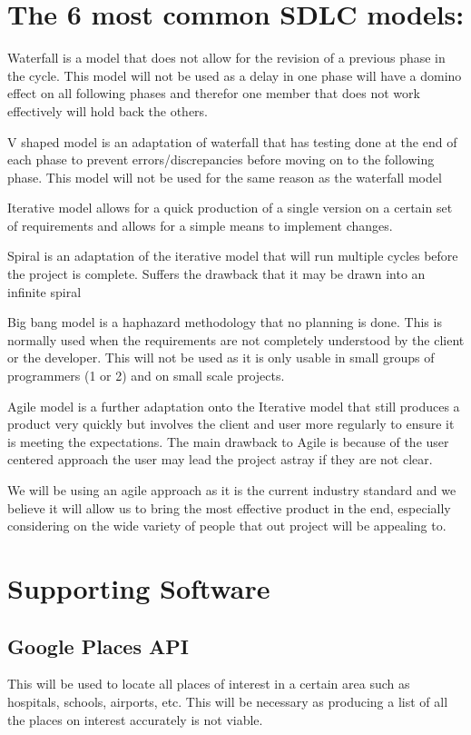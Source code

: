 \documentclass[11pt]{article}
\begin{document}
\section{The 6 most common SDLC models:}

Waterfall is a model that does not allow for the revision of a previous phase in the cycle. This model will not be used as a delay in one phase will have a domino effect on all following phases and therefor one member that does not work effectively will hold back the others.

V shaped model is an adaptation of waterfall that has testing done at the end of each phase to prevent errors/discrepancies before moving on to the following phase. This model will not be used for the same reason as the waterfall model

Iterative model allows for a quick production of a single version on a certain set of requirements and allows for a simple means to implement changes.

Spiral is an adaptation of the iterative model that will run multiple cycles before the project is complete. Suffers the drawback that it may be drawn into an infinite spiral

Big bang model is a haphazard methodology that no planning is done. This is normally used when the requirements are not completely understood by the client or the developer. This will not be used as it is only usable in small groups of programmers (1 or 2) and on small scale projects.

Agile model is a further adaptation onto the Iterative model that still produces a product very quickly but involves the client and user more regularly to ensure it is meeting the expectations. The main drawback to Agile is because of the user centered approach the user may lead the project astray if they are not clear.

We will be using an agile approach as it is the current industry standard and we believe it will allow us to bring the most effective product in the end, especially considering on the wide variety of people that out project will be appealing to.

\section{Supporting Software}
	\subsection{Google Places API} 
	This will be used to locate all places of interest in a certain area such as hospitals, schools, airports, etc. This will be necessary as producing a list of all the places on interest accurately is not viable.
	
\end{document}
